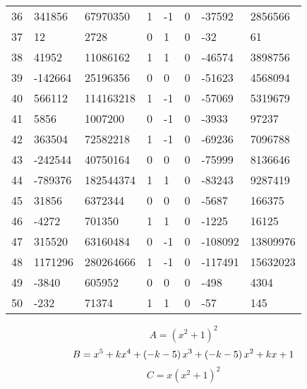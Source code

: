 \documentclass{amsart}
\begin{document}
\begin{longtable}{|l|l|l|lllll|}
36&341856&67970350&1&-1&0&-37592&2856566\\
37&12&2728&0&1&0&-32&61\\
38&41952&11086162&1&1&0&-46574&3898756\\
39&-142664&25196356&0&0&0&-51623&4568094\\
40&566112&114163218&1&-1&0&-57069&5319679\\
41&5856&1007200&0&-1&0&-3933&97237\\
42&363504&72582218&1&-1&0&-69236&7096788\\
43&-242544&40750164&0&0&0&-75999&8136646\\
44&-789376&182544374&1&1&0&-83243&9287419\\
45&31856&6372344&0&0&0&-5687&166375\\
46&-4272&701350&1&1&0&-1225&16125\\
47&315520&63160484&0&-1&0&-108092&13809976\\
48&1171296&280264666&1&-1&0&-117491&15632023\\
49&-3840&605952&0&0&0&-498&4304\\
50&-232&71374&1&1&0&-57&145\\
\hline
\end{longtable}
$$A=(x^2
 + 1)^{2}$$
$$B=x^5
 + k\*x^4
 + \left(-k
 - 5\right) \*x^3
 + \left(-k
 - 5\right) \*x^2
 + k\*x
 + 1$$
$$C=x(x^2
 + 1)^{2}$$
\end{document}
